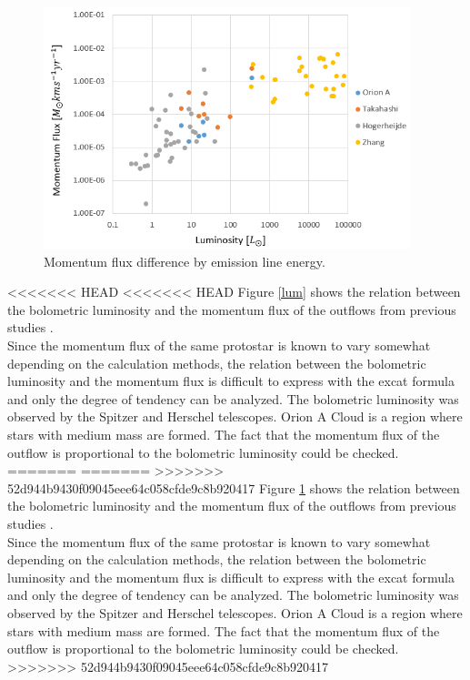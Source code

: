 \begin{figure}[h!]
	\centering
	\includegraphics[width=0.95\textwidth]{Luminosity}
	\caption{Momentum flux difference by emission line energy.}
	\label{fig:lum}
\end{figure}


<<<<<<< HEAD
<<<<<<< HEAD
Figure \ref{lum} shows the relation between the bolometric luminosity and the momentum flux of the outflows from previous studies \cite{takahashi2008millimeter, van2013outflow, hogerheijde1998envelope, nakamura2012evidence, aso2000dense, zhang2005search}. \\ Since the momentum flux of the same protostar is known to vary somewhat depending on the calculation methods\cite{van2013outflow}, the relation between the bolometric luminosity and the momentum flux is difficult to express with the excat formula and only the degree of tendency can be analyzed.
The bolometric luminosity was observed by the Spitzer and Herschel telescopes. Orion A Cloud is a region where stars with medium mass are formed. The fact that the momentum flux of the outflow is proportional to the bolometric luminosity could be checked.	
=======
=======
>>>>>>> 52d944b9430f09045eee64c058cfde9c8b920417
Figure \ref{fig:lum} shows the relation between the bolometric luminosity and the momentum flux of the outflows from previous studies \cite{takahashi2008millimeter, van2013outflow, hogerheijde1998envelope, nakamura2012evidence, aso2000dense, zhang2005search}. \\ Since the momentum flux of the same protostar is known to vary somewhat depending on the calculation methods\cite{van2013outflow}, the relation between the bolometric luminosity and the momentum flux is difficult to express with the excat formula and only the degree of tendency can be analyzed.
The bolometric luminosity was observed by the Spitzer and Herschel telescopes. Orion A Cloud is a region where stars with medium mass are formed. The fact that the momentum flux of the outflow is proportional to the bolometric luminosity could be checked.
>>>>>>> 52d944b9430f09045eee64c058cfde9c8b920417

